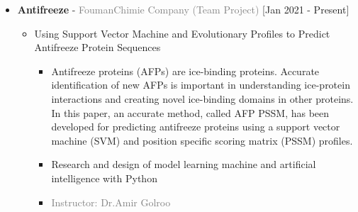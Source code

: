 \documentclass[10pt,a4paper,sans]{moderncv} %
\begin{document}
	\vspace{2em}
	
	\begin{itemize}
		\item {}  \textbf{Antifreeze}  - \textcolor{gray}{FoumanChimie Company}  \hfill\textcolor{gray}{(Team Project)}   [Jan 2021 - Present]
		\begin{itemize}
			\item Using Support Vector Machine and Evolutionary Profiles to Predict Antifreeze Protein Sequences 
			\begin{itemize} 
		     	\item Antifreeze proteins (AFPs) are ice-binding proteins. Accurate identification of new AFPs is important in understanding ice-protein interactions and creating novel ice-binding domains in other proteins. In this paper, an accurate method, called AFP PSSM, has been developed for predicting antifreeze proteins using a support vector machine (SVM) and position specific scoring matrix (PSSM) profiles.
		     	\item Research and design of model learning machine and artificial intelligence with Python
				
				
			    
				\item\textcolor{gray}{Instructor: Dr.Amir Golroo}
			\end{itemize}
			
				\newline
			
		\end{itemize}
	\end{itemize}
	
	\vspace{2em}
	
\end{document}
